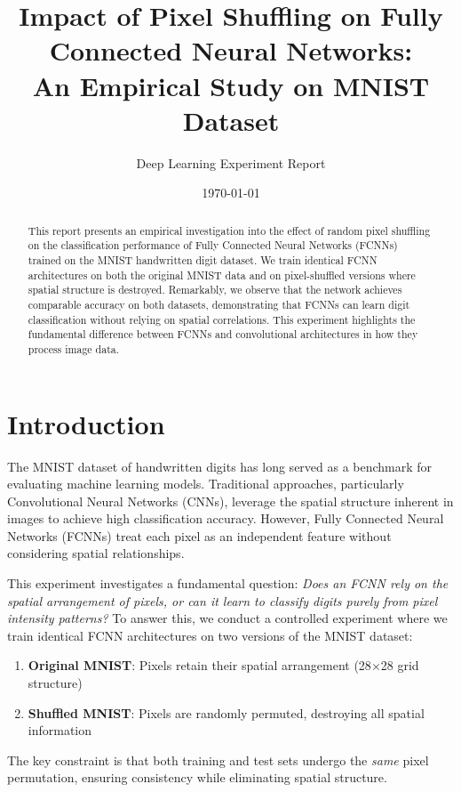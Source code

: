 \documentclass[11pt,a4paper]{article}
\title{\textbf{Impact of Pixel Shuffling on Fully Connected Neural Networks: \\
An Empirical Study on MNIST Dataset}}
\author{Deep Learning Experiment Report}
\date{\today}
\begin{document}
\maketitle

\begin{abstract}
This report presents an empirical investigation into the effect of random pixel shuffling on the classification performance of Fully Connected Neural Networks (FCNNs) trained on the MNIST handwritten digit dataset. We train identical FCNN architectures on both the original MNIST data and on pixel-shuffled versions where spatial structure is destroyed. Remarkably, we observe that the network achieves comparable accuracy on both datasets, demonstrating that FCNNs can learn digit classification without relying on spatial correlations. This experiment highlights the fundamental difference between FCNNs and convolutional architectures in how they process image data.
\end{abstract}

\section{Introduction}

The MNIST dataset of handwritten digits has long served as a benchmark for evaluating machine learning models. Traditional approaches, particularly Convolutional Neural Networks (CNNs), leverage the spatial structure inherent in images to achieve high classification accuracy. However, Fully Connected Neural Networks (FCNNs) treat each pixel as an independent feature without considering spatial relationships.

This experiment investigates a fundamental question: \textit{Does an FCNN rely on the spatial arrangement of pixels, or can it learn to classify digits purely from pixel intensity patterns?} To answer this, we conduct a controlled experiment where we train identical FCNN architectures on two versions of the MNIST dataset:

\begin{enumerate}
    \item \textbf{Original MNIST}: Pixels retain their spatial arrangement (28$\times$28 grid structure)
    \item \textbf{Shuffled MNIST}: Pixels are randomly permuted, destroying all spatial information
\end{enumerate}

The key constraint is that both training and test sets undergo the \textit{same} pixel permutation, ensuring consistency while eliminating spatial structure.
\end{document}

